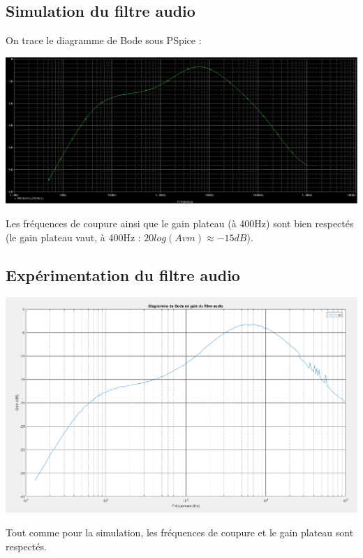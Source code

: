 \documentclass[a4paper]{report}
\begin{document}
\subsection{Simulation du filtre audio}

On trace le diagramme de Bode sous PSpice :

\begin{center}
\includegraphics[width=1\textwidth]{Bode_filtre_audio_avec_potentiometre.PNG}
\end{center}

Les fréquences de coupure ainsi que le gain plateau (à 400Hz) sont bien respectés (le gain plateau vaut, à 400Hz : $20log(Avm) \approx -15dB$).

\subsection{Expérimentation du filtre audio}

\begin{center}
\includegraphics[width=1\textwidth]{Bode_experimental.PNG}
\end{center}

Tout comme pour la simulation, les fréquences de coupure et le gain plateau sont respectés.
\newline
\end{document}
